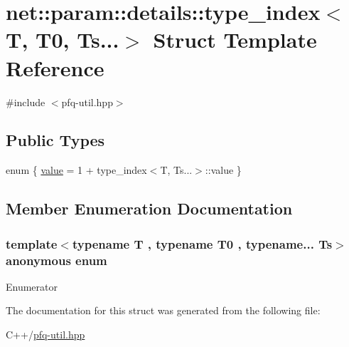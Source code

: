 \hypertarget{structnet_1_1param_1_1details_1_1type__index_3_01T_00_01T0_00_01Ts_8_8_8_4}{\section{net\-:\-:param\-:\-:details\-:\-:type\-\_\-index$<$ T, T0, Ts...$>$ Struct Template Reference}
\label{structnet_1_1param_1_1details_1_1type__index_3_01T_00_01T0_00_01Ts_8_8_8_4}
}


{\ttfamily \#include $<$pfq-\/util.\-hpp$>$}

\subsection*{Public Types}
\begin{DoxyCompactItemize}
\item 
enum \{ \hyperlink{structnet_1_1param_1_1details_1_1type__index_3_01T_00_01T0_00_01Ts_8_8_8_4_a0e1958d65adb96b5b73afd41372b1a8fac571d4fccf6873682c31e1fa9dd70e56}{value} = 1 + type\-\_\-index$<$T, Ts...$>$\-:\-:value
 \}
\end{DoxyCompactItemize}


\subsection{Member Enumeration Documentation}
\hypertarget{structnet_1_1param_1_1details_1_1type__index_3_01T_00_01T0_00_01Ts_8_8_8_4_a0e1958d65adb96b5b73afd41372b1a8f}{\subsubsection[{anonymous enum}]{\setlength{\rightskip}{0pt plus 5cm}template$<$typename T , typename T0 , typename... Ts$>$ anonymous enum}}\label{structnet_1_1param_1_1details_1_1type__index_3_01T_00_01T0_00_01Ts_8_8_8_4_a0e1958d65adb96b5b73afd41372b1a8f}
\begin{Desc}
\item[Enumerator]\par
\begin{description}
\item[{\em 
\hypertarget{structnet_1_1param_1_1details_1_1type__index_3_01T_00_01T0_00_01Ts_8_8_8_4_a0e1958d65adb96b5b73afd41372b1a8fac571d4fccf6873682c31e1fa9dd70e56}{value}\label{structnet_1_1param_1_1details_1_1type__index_3_01T_00_01T0_00_01Ts_8_8_8_4_a0e1958d65adb96b5b73afd41372b1a8fac571d4fccf6873682c31e1fa9dd70e56}
}]\end{description}
\end{Desc}


The documentation for this struct was generated from the following file\-:\begin{DoxyCompactItemize}
\item 
C++/\hyperlink{pfq-util_8hpp}{pfq-\/util.\-hpp}\end{DoxyCompactItemize}
